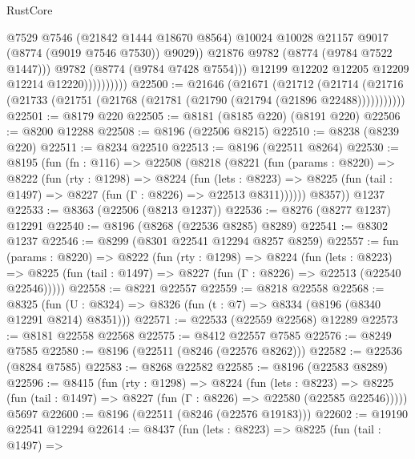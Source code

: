 \begin{lexlean}{RustCore}
\begin{coremodule}
                                @7529
                                @7546
                                (@21842 @1444 @18670 @8564)
                                @10024
                                @10028
                                @21157
                                @9017
                                (@8774 (@9019 @7546 @7530))
                                @9029))
                            @21876
                            @9782
                            (@8774 (@9784 @7522 @1447)))
                          @9782
                          (@8774 (@9784 @7428 @7554)))
                        @12199
                        @12202
                        @12205
                        @12209
                        @12214
                        @12220))))))))))
@22500 := @21646
    (@21671
      (@21712
        (@21714 (@21716 (@21733 (@21751 (@21768 (@21781 (@21790 (@21794 (@21896 @22488)))))))))))
@22501 := @8179 @220
@22505 := @8181 (@8185 @220) (@8191 @220)
@22506 := @8200 @12288
@22508 := @8196 (@22506 @8215)
@22510 := @8238 (@8239 @220)
@22511 := @8234 @22510
@22513 := @8196 (@22511 @8264)
@22530 := @8195
    (fun (fn : @116) =>
    @22508
      (@8218
        (@8221
          (fun (params : @8220) =>
          @8222
            (fun (rty : @1298) =>
            @8224
              (fun (lets : @8223) =>
              @8225 (fun (tail : @1497) => @8227 (fun (Γ : @8226) => @22513 @8311))))))
        @8357))
    @1237
@22533 := @8363 (@22506 (@8213 @1237))
@22536 := @8276 (@8277 @1237) @12291
@22540 := @8196 (@8268 (@22536 @8285) @8289)
@22541 := @8302 @1237
@22546 := @8299 (@8301 @22541 @12294 @8257 @8259)
@22557 := fun (params : @8220) =>
  @8222
    (fun (rty : @1298) =>
    @8224
      (fun (lets : @8223) =>
      @8225 (fun (tail : @1497) => @8227 (fun (Γ : @8226) => @22513 (@22540 @22546)))))
@22558 := @8221 @22557
@22559 := @8218 @22558
@22568 := @8325
    (fun (U : @8324) => @8326 (fun (t : @7) => @8334 (@8196 (@8340 @12291 @8214) @8351)))
@22571 := @22533 (@22559 @22568) @12289
@22573 := @8181 @22558 @22568
@22575 := @8412 @22557 @7585
@22576 := @8249 @7585
@22580 := @8196 (@22511 (@8246 (@22576 @8262)))
@22582 := @22536 (@8284 @7585)
@22583 := @8268 @22582
@22585 := @8196 (@22583 @8289)
@22596 := @8415
    (fun (rty : @1298) =>
    @8224
      (fun (lets : @8223) =>
      @8225 (fun (tail : @1497) => @8227 (fun (Γ : @8226) => @22580 (@22585 @22546)))))
    @5697
@22600 := @8196 (@22511 (@8246 (@22576 @19183)))
@22602 := @19190 @22541 @12294
@22614 := @8437
    (fun (lets : @8223) =>
    @8225
      (fun (tail : @1497) =>

\end{coremodule}
\end{lexlean}

